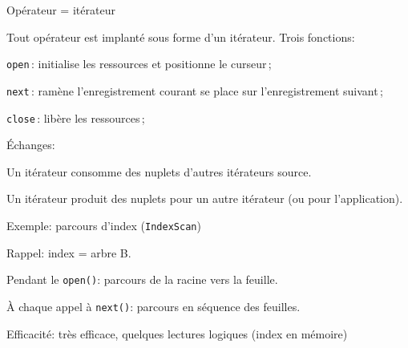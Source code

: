 
\begin{frame}{Opérateur =  itérateur}

Tout opérateur est implanté sous forme d'un \alert{itérateur}.
Trois fonctions:

\begin{redbullet}
  \item \texttt{open}\,: initialise les ressources et 
            positionne le curseur\,;
   
  \item \texttt{next}\,: ramène l'enregistrement courant\;
          se place sur l'enregistrement suivant\,;

  \item \texttt{close}\,: libère les ressources\,;
\end{redbullet}

\vfill

\'Echanges: 

\begin{blocgauche}
\begin{redbullet}
  \item Un itérateur \alert{consomme} des nuplets d'autres itérateurs \alert{source}.
  \item Un itérateur \alert{produit} des nuplets pour un autre
     itérateur (ou pour l'application).
\end{redbullet}  
\end{blocgauche}
    
    
\end{frame}


\begin{frame}[fragile]{Exemple: parcours d'index (\texttt{IndexScan})}

Rappel: index = arbre B. 

\vfill

\begin{redbullet} 
  \item  Pendant le \texttt{open()}: parcours de la racine vers la feuille.
  \item À chaque appel à \texttt{next()}: parcours en séquence des feuilles.  
\end{redbullet}



\smallskip
\begin{blocgauche}
\alert{Efficacité}: très efficace, quelques lectures logiques (index en mémoire)
\end{blocgauche}
\end{frame}

